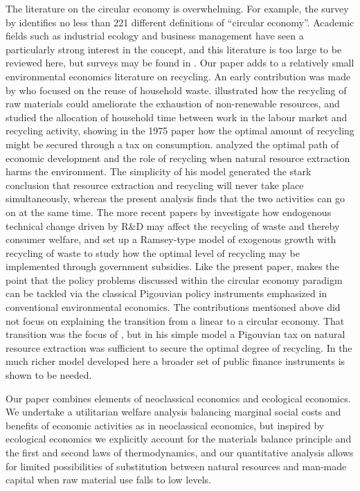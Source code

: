 The literature on the circular economy is overwhelming. For example, the survey by \textcite{kirchherr2023} identifies no less than 221 different definitions of ``circular economy''. Academic fields such as industrial ecology and business management have seen a particularly strong interest in the concept, and this literature is too large to be reviewed here, but surveys may be found in \textcite{winans2017,merli2018,centobelli2020,ferasso2020}. Our paper adds to a relatively small environmental economics literature on recycling. An early contribution was made by \textcite{smith1972} who focused on the reuse of household waste. \textcite{schultze1973} illustrated how the recycling of raw materials could ameliorate the exhaustion of non-renewable resources, and \textcite{lusky1975,lusky1976} studied the allocation of household time between work in the labour market and recycling activity, showing in the 1975 paper how the optimal amount of recycling might be secured through a tax on consumption. \textcite{hoel1978} analyzed the optimal path of economic development and the role of recycling when natural resource extraction harms the environment. The simplicity of his model generated the stark conclusion that resource extraction and recycling will never take place simultaneously, whereas the present analysis finds that the two activities can go on at the same time. The more recent papers by \textcite{divita2001,divita2007} investigate how endogenous technical change driven by R\&D may affect the recycling of waste and thereby consumer welfare, and \textcite{pittel2010} set up a Ramsey-type model of exogenous growth with recycling of waste to study how the optimal level of recycling may be implemented through government subsidies. Like the present paper, \textcite{andersen2007} makes the point that the policy problems discussed within the circular economy paradigm can be tackled via the classical Pigouvian policy instruments emphasized in conventional environmental economics. The contributions mentioned above did not focus on explaining the transition from a linear to a circular economy. That transition was the focus of \textcite{sorensen2018}, but in his simple model a Pigouvian tax on natural resource extraction was sufficient to secure the optimal degree of recycling. In the much richer model developed here a broader set of public finance instruments is shown to be needed.

Our paper combines elements of neoclassical economics and ecological economics. We undertake a utilitarian welfare analysis balancing marginal social costs and benefits of economic activities as in neoclassical economics, but inspired by ecological economics we explicitly account for the materials balance principle and the first and second laws of thermodynamics, and our quantitative analysis allows for limited possibilities of substitution between natural resources and man-made capital when raw material use falls to low levels.

